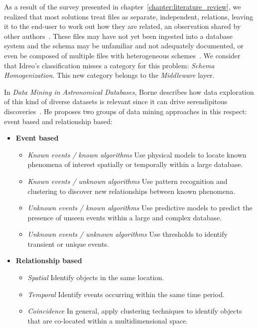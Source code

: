 As a result of the survey presented in chapter~\ref{chapter:literature_review},
we realized that most solutions treat files
as separate, independent, relations, leaving it to the end-user to work out how they are related,
an observation shared by other authors~\cite{Silva2016}.
These files may have not yet been ingested into a database system and 
the schema may be unfamiliar and not adequately documented, or even be
composed of multiple files with heterogeneous schemes~\cite{alawini2016,zhang2015astronomy}.
We consider that Idreo's classification misses a category for this problem:
\emph{Schema Homogenization}. This new category belongs to the \emph{Middleware} layer.

In \emph{Data Mining in Astronomical Databases}, Borne
describes how data exploration of this kind of diverse datasets is
relevant since it can drive serendipitous discoveries~\cite{Borne2001}. He proposes
two groups of data mining approaches in this respect: event
based and relationship based:

\begin{itemize}
    \item \textbf{Event based}
        \begin{itemize}
          \item \emph{Known events / known algorithms}
            Use physical models to locate known phenomena of interest spatially
            or temporally within a large database.
          \item \emph{Known events / unknown algorithms}
            Use pattern recognition and clustering to discover new relationships between known
            phenomena.
          \item \emph{Unknown events / known algorithms}
            Use predictive models to predict the presence of unseen events within a
            large and complex database.
          \item \emph{Unknown events / unknown algorithms}
            Use thresholds to identify transient or unique events.
        \end{itemize}

    \item \textbf{Relationship based}
        \begin{itemize}
            \item \emph{Spatial}
                Identify objects in the same location.
            \item \emph{Temporal}
                Identify events occurring within the same time period.
            \item \emph{Coincidence}
                In general, apply clustering techniques to
                identify objects that are co-located within a multidimensional space.
        \end{itemize}
\end{itemize}

